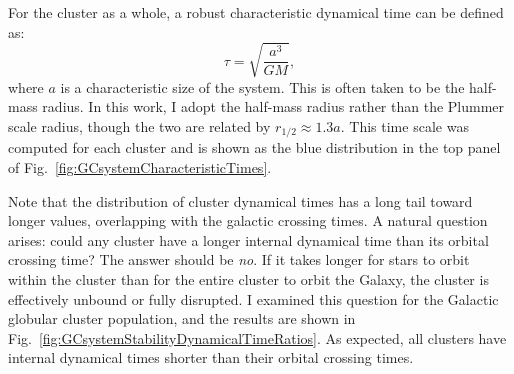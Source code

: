         For the cluster as a whole, a robust characteristic dynamical time can be defined as:
        \begin{equation}
            \tau = \sqrt{\frac{a^3}{GM}},
        \end{equation}
        where \( a \) is a characteristic size of the system. This is often taken to be the half-mass radius. In this work, I adopt the half-mass radius rather than the Plummer scale radius, though the two are related by \( r_{\mathrm{1/2}} \approx 1.3a \). This time scale was computed for each cluster and is shown as the blue distribution in the top panel of Fig.~\ref{fig:GCsystemCharacteristicTimes}.

        Note that the distribution of cluster dynamical times has a long tail toward longer values, overlapping with the galactic crossing times. A natural question arises: could any cluster have a longer internal dynamical time than its orbital crossing time? The answer should be \textit{no}. If it takes longer for stars to orbit within the cluster than for the entire cluster to orbit the Galaxy, the cluster is effectively unbound or fully disrupted. I examined this question for the Galactic globular cluster population, and the results are shown in Fig.~\ref{fig:GCsystemStabilityDynamicalTimeRatios}. As expected, all clusters have internal dynamical times shorter than their orbital crossing times.

